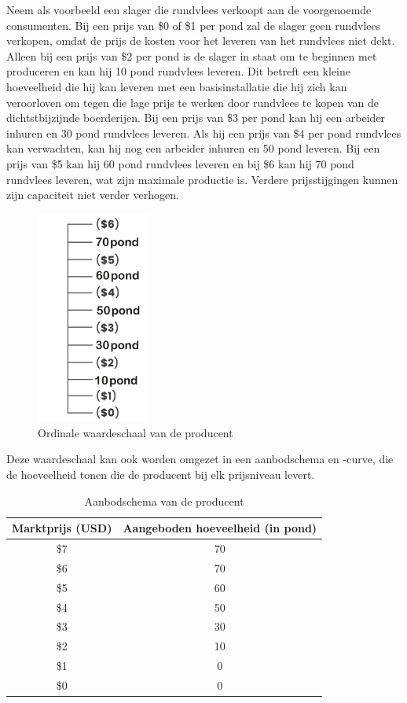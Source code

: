 Neem als voorbeeld een slager die rundvlees verkoopt aan de voorgenoemde consumenten. Bij een prijs van \$0 of \$1 per pond zal de slager geen rundvlees verkopen, omdat de prijs de kosten voor het leveren van het rundvlees niet dekt. Alleen bij een prijs van \$2 per pond is de slager in staat om te beginnen met produceren en kan hij 10 pond rundvlees leveren. Dit betreft een kleine hoeveelheid die hij kan leveren met een basisinstallatie die hij zich kan veroorloven om tegen die lage prijs te werken door rundvlees te kopen van de dichtstbijzijnde boerderijen. Bij een prijs van \$3 per pond kan hij een arbeider inhuren en 30 pond rundvlees leveren. Als hij een prijs van \$4 per pond rundvlees kan verwachten, kan hij nog een arbeider inhuren en 50 pond leveren. Bij een prijs van \$5 kan hij 60 pond rundvlees leveren en bij \$6 kan hij 70 pond rundvlees leveren, wat zijn maximale productie is. Verdere prijsstijgingen kunnen zijn capaciteit niet verder verhogen.

\begin{figure}[H]
\centering
    \includegraphics[height=7cm]{figures/fig23-1.png}
    \caption[Ordinale waardeschaal van de producent]{Ordinale waardeschaal van de producent}
    \label{fig23}
\end{figure}

Deze waardeschaal kan ook worden omgezet in een aanbodschema en -curve, die de hoeveelheid tonen die de producent bij elk prijsniveau levert.

\begin{table}[H]
\centering
\begin{tabular}{|c|c|}  %
\hline  %
    \cellcolor{gray!25}Marktprijs (USD) &
    \cellcolor{gray!25}Aangeboden hoeveelheid (in pond) \\
\hline  %
 \$7 & 70 \\ \hline
 \$6 & 70 \\ \hline
 \$5 & 60 \\ \hline
 \$4 & 50 \\ \hline
 \$3 & 30 \\ \hline
 \$2 & 10 \\ \hline
 \$1 & 0  \\ \hline
 \$0 & 0  \\ \hline  %
\end{tabular}
\caption{Aanbodschema van de producent}
\label{tab5}
\end{table}

